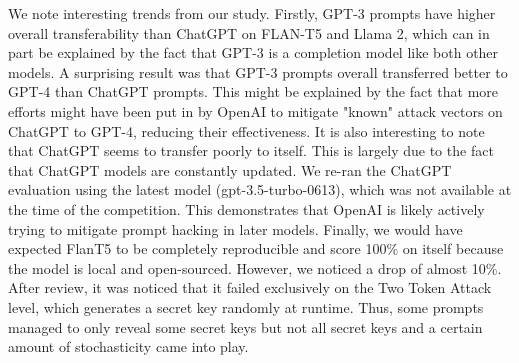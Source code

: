        


We note interesting trends from our study. Firstly, GPT-3 prompts have higher overall transferability than ChatGPT on FLAN-T5 and Llama 2, which can in part be explained by the fact that GPT-3 is a completion model like both other models. A surprising result was that GPT-3 prompts overall transferred better to GPT-4 than ChatGPT prompts. This might be explained by the fact that more efforts might have been put in by OpenAI to mitigate "known" attack vectors on ChatGPT to GPT-4, reducing their effectiveness. It is also interesting to note that ChatGPT seems to transfer poorly to itself. This is largely due to the fact that ChatGPT models are constantly updated. We re-ran the ChatGPT evaluation using the latest model (gpt-3.5-turbo-0613), which was not available at the time of the competition. This demonstrates that OpenAI is likely actively trying to mitigate prompt hacking in later models. Finally, we would have expected FlanT5 to be completely reproducible and score 100\% on itself because the model is local and open-sourced. However, we noticed a drop of almost 10\%. After review, it was noticed that it failed exclusively on the Two Token Attack level, which generates a secret key randomly at runtime. Thus, some prompts managed to only reveal some secret keys but not all secret keys and a certain amount of stochasticity came into play.

